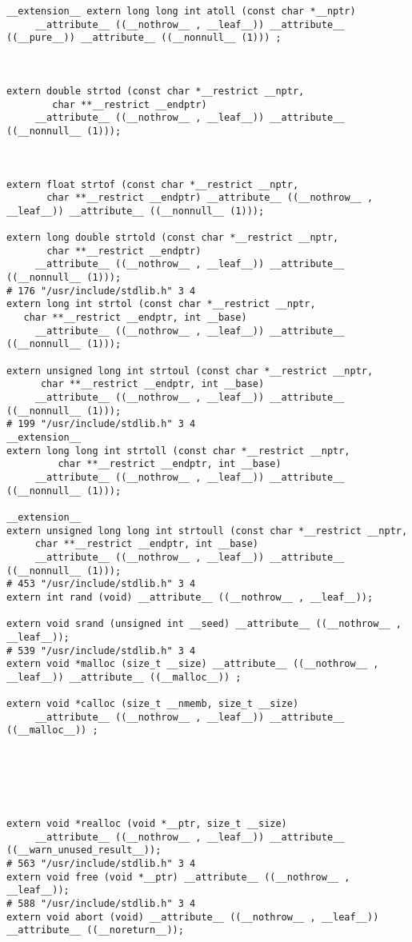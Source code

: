 \documentclass[11pt]{article}
\begin{document}
\begin{verbatim}
__extension__ extern long long int atoll (const char *__nptr)
     __attribute__ ((__nothrow__ , __leaf__)) __attribute__ ((__pure__)) __attribute__ ((__nonnull__ (1))) ;



extern double strtod (const char *__restrict __nptr,
        char **__restrict __endptr)
     __attribute__ ((__nothrow__ , __leaf__)) __attribute__ ((__nonnull__ (1)));



extern float strtof (const char *__restrict __nptr,
       char **__restrict __endptr) __attribute__ ((__nothrow__ , __leaf__)) __attribute__ ((__nonnull__ (1)));

extern long double strtold (const char *__restrict __nptr,
       char **__restrict __endptr)
     __attribute__ ((__nothrow__ , __leaf__)) __attribute__ ((__nonnull__ (1)));
# 176 "/usr/include/stdlib.h" 3 4
extern long int strtol (const char *__restrict __nptr,
   char **__restrict __endptr, int __base)
     __attribute__ ((__nothrow__ , __leaf__)) __attribute__ ((__nonnull__ (1)));

extern unsigned long int strtoul (const char *__restrict __nptr,
      char **__restrict __endptr, int __base)
     __attribute__ ((__nothrow__ , __leaf__)) __attribute__ ((__nonnull__ (1)));
# 199 "/usr/include/stdlib.h" 3 4
__extension__
extern long long int strtoll (const char *__restrict __nptr,
         char **__restrict __endptr, int __base)
     __attribute__ ((__nothrow__ , __leaf__)) __attribute__ ((__nonnull__ (1)));

__extension__
extern unsigned long long int strtoull (const char *__restrict __nptr,
     char **__restrict __endptr, int __base)
     __attribute__ ((__nothrow__ , __leaf__)) __attribute__ ((__nonnull__ (1)));
# 453 "/usr/include/stdlib.h" 3 4
extern int rand (void) __attribute__ ((__nothrow__ , __leaf__));

extern void srand (unsigned int __seed) __attribute__ ((__nothrow__ , __leaf__));
# 539 "/usr/include/stdlib.h" 3 4
extern void *malloc (size_t __size) __attribute__ ((__nothrow__ , __leaf__)) __attribute__ ((__malloc__)) ;

extern void *calloc (size_t __nmemb, size_t __size)
     __attribute__ ((__nothrow__ , __leaf__)) __attribute__ ((__malloc__)) ;






extern void *realloc (void *__ptr, size_t __size)
     __attribute__ ((__nothrow__ , __leaf__)) __attribute__ ((__warn_unused_result__));
# 563 "/usr/include/stdlib.h" 3 4
extern void free (void *__ptr) __attribute__ ((__nothrow__ , __leaf__));
# 588 "/usr/include/stdlib.h" 3 4
extern void abort (void) __attribute__ ((__nothrow__ , __leaf__)) __attribute__ ((__noreturn__));




\end{verbatim}
\end{document}
